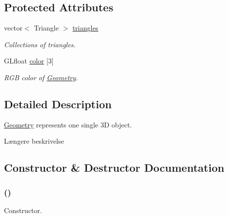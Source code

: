 \subsection*{Protected Attributes}
\begin{CompactItemize}
\item 
\hypertarget{class_geometry_f5856d7f036811ac0ff4aa6e62131427}{
vector$<$ Triangle $>$ \hyperlink{class_geometry_f5856d7f036811ac0ff4aa6e62131427}{triangles}}
\label{class_geometry_f5856d7f036811ac0ff4aa6e62131427}

\begin{CompactList}\small\item\em Collections of triangles. \item\end{CompactList}\item 
\hypertarget{class_geometry_f74d0a39b3fc1939e0826a560006b748}{
GLfloat \hyperlink{class_geometry_f74d0a39b3fc1939e0826a560006b748}{color} \mbox{[}3\mbox{]}}
\label{class_geometry_f74d0a39b3fc1939e0826a560006b748}

\begin{CompactList}\small\item\em RGB color of \hyperlink{class_geometry}{Geometry}. \item\end{CompactList}\end{CompactItemize}


\subsection{Detailed Description}
\hyperlink{class_geometry}{Geometry} represents one single 3D object. 

Længere beskrivelse 

\subsection{Constructor \& Destructor Documentation}
\hypertarget{class_geometry_ddb32f0091124e3b461bec6677b2e17b}{
\subsubsection[{Geometry}]{ ()}}
\label{class_geometry_ddb32f0091124e3b461bec6677b2e17b}


Constructor. 

